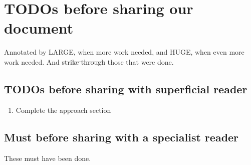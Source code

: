 \documentclass[acmsmall,review,anonymous]{acmart}\settopmatter{printfolios=true}
\begin{document}
\section{TODOs before sharing our document}

Annotated by LARGE, when more work needed, and HUGE, when even more work needed.
 And \st{strike through} those that were done.
 
\subsection{TODOs before sharing with superficial reader}

 
\begin{enumerate}
\item
Complete the approach section
\end{enumerate}
 
 \subsection{Must before sharing with a specialist reader}
 These must have been done.  
 
\end{document}
